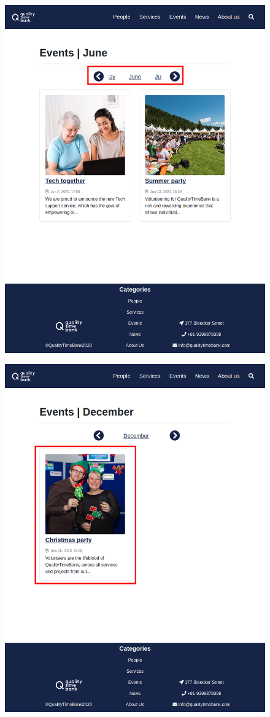 \documentclass[a4paper, 11pt, parskip=half, headsepline]{scrreprt}
\begin{document}
\begin{figure}[H]
\begin{minipage}[t]{0.5\textwidth}
    	\includegraphics[width=0.9\linewidth, keepaspectratio]{scenarios/scenario-32}
    	\caption{}
    	\label{fig:scenario-32}
    \end{minipage}
\end{figure}

\begin{figure}[H]
    \centering
	\includegraphics[width=0.4\linewidth, keepaspectratio]{scenarios/scenario-33}
	\caption{}
	\label{fig:scenario-33}
\end{figure}
\end{document}
